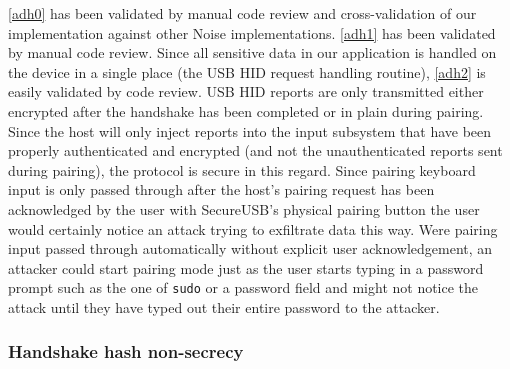 \documentclass[12pt,a4paper,notitlepage]{article}
\begin{document}
\ref{adh0} has been validated by manual code review and cross-validation of our implementation against other Noise
implementations. %
\ref{adh1} has been validated by manual code review. %
Since all sensitive data in our application is handled on the device in a single place (the USB HID request handling
routine), \ref{adh2} is easily validated by code review. USB HID reports are only transmitted either encrypted after the
handshake has been completed or in plain during pairing. Since the host will only inject reports into the input
subsystem that have been properly authenticated and encrypted (and not the unauthenticated reports sent during pairing),
the protocol is secure in this regard. Since pairing keyboard input is only passed through after the host's pairing
request has been acknowledged by the user with SecureUSB's physical pairing button the user would certainly notice an
attack trying to exfiltrate data this way. Were pairing input passed through automatically without explicit user
acknowledgement, an attacker could start pairing mode just as the user starts typing in a password prompt such as the
one of \texttt{sudo} or a password field and might not notice the attack until they have typed out their entire password
to the attacker.

\subsubsection{Handshake hash non-secrecy}
\end{document}
